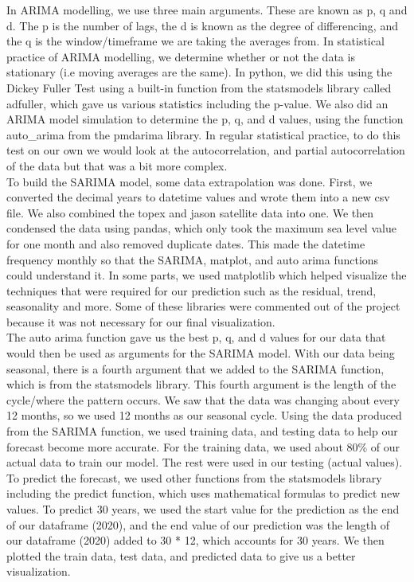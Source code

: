\documentclass[fontsize=11pt]{article}
\begin{document}
    In ARIMA modelling, we use three main arguments. These are known as p, q and d. The p is the number of lags, the d is known as the degree of differencing, and the q is the window/timeframe we are taking the averages from. In statistical practice of ARIMA modelling, we determine whether or not the data is stationary (i.e moving averages are the same). In python, we did this using the Dickey Fuller Test using a built-in function from the statsmodels library called adfuller, which gave us various statistics including the p-value. We also did an ARIMA model simulation to determine the p, q, and d values, using the function auto\_arima from the pmdarima library. In regular statistical practice, to do this test on our own we would look at the autocorrelation, and partial autocorrelation of the data but that was a bit more complex. \\

    To build the SARIMA model, some data extrapolation was done. First, we converted the decimal years to datetime values and wrote them into a new csv file. We also combined the topex and jason satellite data into one. We then condensed the data using pandas, which only took the maximum sea level value for one month and also removed duplicate dates. This made the datetime frequency monthly so that the SARIMA, matplot, and auto arima functions could understand it. In some parts, we used matplotlib which helped visualize the techniques that were required for our prediction such as the residual, trend, seasonality and more. Some of these libraries were commented out of the project because it was not necessary for our final visualization. \\

    The auto arima function gave us the best p, q, and d values for our data that would then be used as arguments for the SARIMA model. With our data being seasonal, there is a fourth argument that we added to the SARIMA function, which is from the statsmodels library. This fourth argument is the length of the cycle/where the pattern occurs. We saw that the data was changing about every 12 months, so we used 12 months as our seasonal cycle. Using the data produced from the SARIMA function, we used training data, and testing data to help our forecast become more accurate. For the training data, we used about 80\% of our actual data to train our model. The rest were used in our testing (actual values). To predict the forecast, we used other functions from the statsmodels library including the predict function, which uses mathematical formulas to predict new values. To predict 30 years, we used the start value for the prediction as the end of our dataframe (2020), and the end value of our prediction was the length of our dataframe (2020) added to 30 * 12, which accounts for 30 years. We then plotted the train data, test data, and predicted data to give us a better visualization. \\
\end{document}
